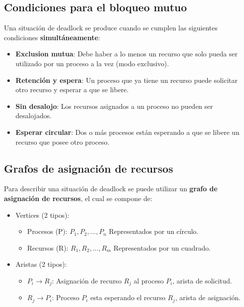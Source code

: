 \documentclass{templateNote}
\begin{document}
\subsection*{Condiciones para el bloqueo mutuo}
Una situación de deadlock se produce cuando se cumplen las siguientes condiciones \textbf{simultáneamente}:
\begin{itemize}
    \item \textbf{Exclusion mutua}: Debe haber a lo menos un recurso que solo pueda ser utilizado por un proceso a la vez (modo exclusivo).
    \item \textbf{Retención y espera}: Un proceso que ya tiene un recurso puede solicitar otro recurso y esperar a que se libere.
    \item \textbf{Sin desalojo}: Los recursos asignados a un proceso no pueden ser desalojados.
    \item \textbf{Esperar circular}: Dos o más procesos están esperando a que se libere un recurso que posee otro proceso.
\end{itemize}

\subsection*{Grafos de asignación de recursos}
Para describir una situación de deadlock se puede utilizar un \textbf{grafo de asignación de recursos}, el cual se compone de:
\begin{itemize}
    \item Vertices (2 tipos):
    \begin{itemize}
        \item Procesos (P): {$P_1, P_2, ... , P_n$} Representados por un círculo.
        \item Recursos (R): {$R_1, R_2, ... , R_m$} Representados por un cuadrado.
    \end{itemize}
    \item Aristas (2 tipos):
    \begin{itemize}
        \item $P_{i} \rightarrow R_{j}$: Asignación de recurso $R_{j}$ al proceso $P_{i}$, arista de solicitud.
        \item $R_{j} \rightarrow P_{i}$: Proceso $P_{i}$ esta esperando el recurso $R_{j}$, arista de asignación.
    \end{itemize}
\end{itemize} 
\end{document}
